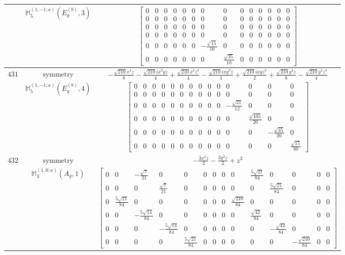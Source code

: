 \documentclass[fleqn,8pt,landscape]{jsarticle}
\begin{document}
\begin{longtable}{ccc}
$  $ & $ \mathbb{M}_{5}^{(1,-1;a)}(E_{g}^{(b)},3) $ & $ \begin{bmatrix} 0 & 0 & 0 & 0 & 0 & 0 & 0 & 0 & 0 & 0 & 0 & 0 & 0 & 0 \\ 0 & 0 & 0 & 0 & 0 & 0 & 0 & 0 & 0 & 0 & 0 & 0 & 0 & 0 \\ 0 & 0 & 0 & 0 & 0 & 0 & 0 & 0 & 0 & 0 & 0 & 0 & 0 & 0 \\ 0 & 0 & 0 & 0 & 0 & 0 & 0 & 0 & 0 & 0 & 0 & 0 & 0 & 0 \\ 0 & 0 & 0 & 0 & 0 & 0 & - \frac{\sqrt{15}}{10} & 0 & 0 & 0 & 0 & 0 & 0 & 0 \\ 0 & 0 & 0 & 0 & 0 & 0 & 0 & \frac{\sqrt{35}}{10} & 0 & 0 & 0 & 0 & 0 & 0 \end{bmatrix} $ \\ \hline
$ 431 $ & $ \text{symmetry} $ & $ - \frac{\sqrt{210} x^{4} z}{8} - \frac{\sqrt{210} i x^{3} y z}{4} + \frac{\sqrt{210} x^{2} z^{3}}{4} - \frac{\sqrt{210} i x y^{3} z}{4} + \frac{\sqrt{210} i x y z^{3}}{2} + \frac{\sqrt{210} y^{4} z}{8} - \frac{\sqrt{210} y^{2} z^{3}}{4} $ \\
$  $ & $ \mathbb{M}_{5}^{(1,-1;a)}(E_{g}^{(b)},4) $ & $ \begin{bmatrix} 0 & 0 & 0 & 0 & 0 & 0 & 0 & 0 & 0 & 0 & 0 & 0 & 0 & 0 \\ 0 & 0 & 0 & 0 & 0 & 0 & 0 & 0 & 0 & 0 & 0 & 0 & 0 & 0 \\ 0 & 0 & 0 & 0 & 0 & 0 & 0 & 0 & 0 & 0 & - \frac{\sqrt{21}}{12} & 0 & 0 & 0 \\ 0 & 0 & 0 & 0 & 0 & 0 & 0 & 0 & 0 & 0 & 0 & \frac{\sqrt{105}}{20} & 0 & 0 \\ 0 & 0 & 0 & 0 & 0 & 0 & 0 & 0 & 0 & 0 & 0 & 0 & - \frac{\sqrt{35}}{20} & 0 \\ 0 & 0 & 0 & 0 & 0 & 0 & 0 & 0 & 0 & 0 & 0 & 0 & 0 & \frac{\sqrt{15}}{60} \end{bmatrix} $ \\ \hline
$ 432 $ & $ \text{symmetry} $ & $ - \frac{3 x^{2} z}{2} - \frac{3 y^{2} z}{2} + z^{3} $ \\
$  $ & $ \mathbb{M}_{3}^{(1,0;a)}(A_{g},1) $ & $ \begin{bmatrix} 0 & 0 & - \frac{\sqrt{7}}{21} & 0 & 0 & 0 & 0 & 0 & 0 & \frac{5 \sqrt{21}}{84} & 0 & 0 & 0 & 0 \\ 0 & 0 & 0 & \frac{\sqrt{7}}{21} & 0 & 0 & 0 & 0 & 0 & 0 & \frac{5 \sqrt{21}}{84} & 0 & 0 & 0 \\ 0 & \frac{5 \sqrt{21}}{84} & 0 & 0 & 0 & 0 & 0 & 0 & \frac{\sqrt{210}}{84} & 0 & 0 & 0 & 0 & 0 \\ 0 & 0 & - \frac{5 \sqrt{14}}{84} & 0 & 0 & 0 & 0 & 0 & 0 & \frac{\sqrt{42}}{84} & 0 & 0 & 0 & 0 \\ 0 & 0 & 0 & - \frac{5 \sqrt{14}}{84} & 0 & 0 & 0 & 0 & 0 & 0 & - \frac{\sqrt{42}}{84} & 0 & 0 & 0 \\ 0 & 0 & 0 & 0 & \frac{5 \sqrt{21}}{84} & 0 & 0 & 0 & 0 & 0 & 0 & - \frac{\sqrt{210}}{84} & 0 & 0 \end{bmatrix} $ \\ \hline

\end{longtable}
\end{document}
